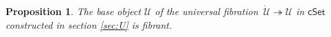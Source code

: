 \documentclass[12pt]{article}
\newcommand{\cSet}{\ensuremath{\mathsf{cSet}}}
\newcommand{\ra}{\ensuremath{\rightarrow}}
\newcommand{\cof}{\ensuremath{\rightarrowtail}}
\newcommand{\fib}{\ensuremath{\twoheadrightarrow}}
\newcommand{\I}{\ensuremath{\mathrm{I}}}
\newcommand{\U}{\ensuremath{\mathcal{U}}}
\newcommand{\UU}{\ensuremath{\,\dot{\mathcal{U}}}}
\newtheorem{proposition}[theorem]{Proposition}
\theoremstyle{remark}
\theoremstyle{definition}
\begin{document}
\begin{proposition}
The base object $\U$ of the universal fibration $\UU\fib\U$ in $\cSet$ constructed in section \ref{sec:U} is fibrant.
\end{proposition}

\end{document}
